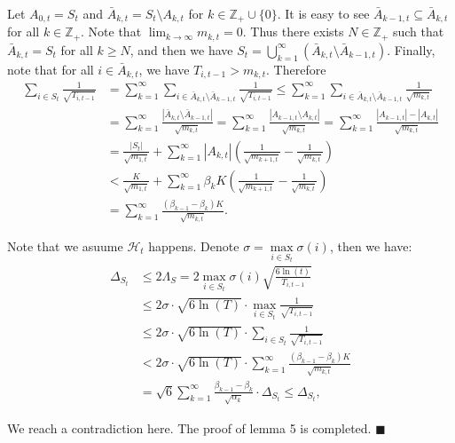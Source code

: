 \documentclass[opre,sglanonrev]{informs4}
\begin{document}
Let $A_{0,t} = S_t$ and $\bar{A}_{k,t}=S_t\setminus A_{k,t}$ for $k\in \mathbb{Z}_+\cup \{0\}$. It is easy to see $\bar{A}_{k-1,t}\subseteq\bar{A}_{k,t}$ for all $k\in \mathbb{Z}_+$. Note that $\lim_{k \to \infty}m_{k,t}=0$. Thus there exists $N\in \mathbb{Z}_+$ such that $\bar{A}_{k,t}=S_t$ for all $k\geq N$, and then we have $S_t=\bigcup_{k=1}^\infty\left(\bar{A}_{k,t}\setminus\bar{A}_{k-1,t}\right)$. Finally, note that for all $i\in \bar{A}_{k,t}$, we have $T_{i,t-1}>m_{k,t}$. Therefore
$$\begin{aligned}
\sum_{i\in S_t}\frac{1}{\sqrt{T_{i,t-1}}} & =\sum_{k=1}^\infty\sum_{i\in\bar{A}_{k,t}\setminus\bar{A}_{k-1,t}}\frac{1}{\sqrt{T_{i,t-1}}}\leq\sum_{k=1}^\infty\sum_{i\in\bar{A}_{k,t}\setminus\bar{A}_{k-1,t}}\frac{1}{\sqrt{m_{k,t}}} \\
 & =\sum_{k=1}^\infty\frac{\left|\bar{A}_{k,t}\setminus\bar{A}_{k-1,t}\right|}{\sqrt{m_{k,t}}}=\sum_{k=1}^\infty\frac{\left|A_{k-1,t}\setminus A_{k,t}\right|}{\sqrt{m_{k,t}}}=\sum_{k=1}^\infty\frac{\left|A_{k-1,t}\right|-\left|A_{k,t}\right|}{\sqrt{m_{k,t}}} \\
 & =\frac{|S_t|}{\sqrt{m_{1,t}}}+\sum_{k=1}^\infty|A_{k,t}|\left(\frac{1}{\sqrt{m_{k+1,t}}}-\frac{1}{\sqrt{m_{k,t}}}\right) \\
 & <\frac{K}{\sqrt{m_{1,t}}}+\sum_{k=1}^\infty\beta_kK\left(\frac{1}{\sqrt{m_{k+1,t}}}-\frac{1}{\sqrt{m_{k,t}}}\right) \\
 & =\sum_{k=1}^\infty\frac{(\beta_{k-1}-\beta_k)K}{\sqrt{m_{k,t}}}.
\end{aligned}$$

Note that we asuume $\mathcal{H}_t$ happens. Denote $\sigma = \mathop{\max}\limits_{i\in S_t}\sigma(i)$, then we have: 
$$\begin{aligned}
\Delta_{S_t} & \leq 2\Lambda_S=2\mathop{\max}\limits_{i\in S_t}\sigma(i)\sqrt{\frac{6\ln(t)}{T_{i,t-1}}}\\
&\leq 2\sigma \cdot \sqrt{6\ln(T)}\cdot \mathop{\max}\limits_{i\in S_t}\frac{1}{\sqrt{T_{i,t-1}}}\\
&\leq 2\sigma \cdot \sqrt{6\ln(T)}\cdot \sum_{i\in S_t}\frac{1}{\sqrt{T_{i,t-1}}}\\
&<2\sigma \cdot \sqrt{6\ln(T)}\cdot \sum_{k=1}^\infty\frac{(\beta_{k-1}-\beta_k)K}{\sqrt{m_{k,t}}}\\
&=\sqrt{6}\sum_{k=1}^\infty\frac{\beta_{k-1}-\beta_k}{\sqrt{\alpha_k}}\cdot \Delta_{S_t}\leq\Delta_{S_t},
\end{aligned}$$

We reach a contradiction here. The proof of lemma 5 is completed.
\hfill $\blacksquare$
\end{document}
